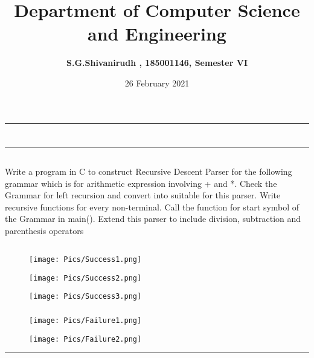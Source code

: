 \documentclass[12pt,letterpaper]{article}
\title{\textbf{Department of Computer Science and Engineering}}
\author{\textbf{S.G.Shivanirudh , 185001146, Semester VI }}
\date{26 February 2021}
\begin{document}
\maketitle
\hrule
\section*{}
\hrule 
\bigskip\bigskip

\subsection*{}

\subsection*{}
\begin{flushleft}
    Write a program in C to construct Recursive Descent Parser for the following grammar which is for arithmetic expression involving + and   *.
    Check the   Grammar   for   left   recursion   and   convert   into suitable for this parser. 
    Write recursive functions for every non-terminal.   Call   the   function   for   start   symbol   of   the   Grammar   in main().
    Extend this parser to include division, subtraction and parenthesis operators
\end{flushleft}

\subsection*{}
\begin{flushleft}

\end{flushleft}

\newpage
\subsection*{}
\subsubsection*{}
\begin{figure}[h]
    \centering
    \texttt{[image: Pics/Success1.png]}
\end{figure}
\begin{figure}
    \centering
    \texttt{[image: Pics/Success2.png]}
\end{figure}
\begin{figure}
    \centering
    \texttt{[image: Pics/Success3.png]}
\end{figure}

\newpage
\subsubsection*{}
\begin{figure}[h!]
    \centering
    \texttt{[image: Pics/Failure1.png]}
\end{figure}
\newpage
\begin{figure}[h]
    \centering
    \texttt{[image: Pics/Failure2.png]}
\end{figure}
\hrule
\end{document}

